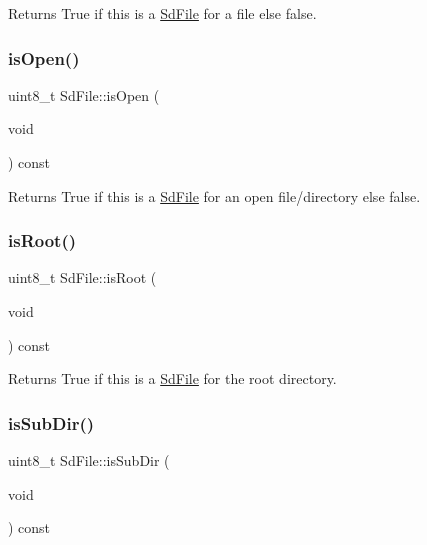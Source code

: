 \begin{DoxyReturn}{Returns}
True if this is a \hyperlink{class_sd_file}{Sd\+File} for a file else false. 
\end{DoxyReturn}
\mbox{\label{class_sd_file_a54e1b9385c43c33dc83eaad6de0d33be}} 
\subsubsection{\texorpdfstring{is\+Open()}{isOpen()}}
{\footnotesize\ttfamily uint8\+\_\+t Sd\+File\+::is\+Open (\begin{DoxyParamCaption}\item[{void}]{ }\end{DoxyParamCaption}) const\hspace{0.3cm}{\ttfamily [inline]}}

\begin{DoxyReturn}{Returns}
True if this is a \hyperlink{class_sd_file}{Sd\+File} for an open file/directory else false. 
\end{DoxyReturn}
\mbox{\label{class_sd_file_a29fd6e80e6cbd3c67724988f9fe02290}} 
\subsubsection{\texorpdfstring{is\+Root()}{isRoot()}}
{\footnotesize\ttfamily uint8\+\_\+t Sd\+File\+::is\+Root (\begin{DoxyParamCaption}\item[{void}]{ }\end{DoxyParamCaption}) const\hspace{0.3cm}{\ttfamily [inline]}}

\begin{DoxyReturn}{Returns}
True if this is a \hyperlink{class_sd_file}{Sd\+File} for the root directory. 
\end{DoxyReturn}
\mbox{\label{class_sd_file_a22fb79f645f5a92baf699d547395667b}} 
\subsubsection{\texorpdfstring{is\+Sub\+Dir()}{isSubDir()}}
{\footnotesize\ttfamily uint8\+\_\+t Sd\+File\+::is\+Sub\+Dir (\begin{DoxyParamCaption}\item[{void}]{ }\end{DoxyParamCaption}) const\hspace{0.3cm}{\ttfamily [inline]}}

